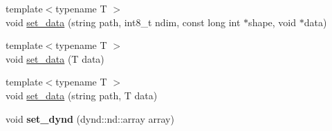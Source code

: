 \begin{DoxyCompactItemize}
\item 
{\footnotesize template$<$typename T $>$ }\\void \hyperlink{classhdc_a009b92dac161a40dc8e17231a4575c1a}{set\+\_\+data} (string path, int8\+\_\+t ndim, const long int $\ast$shape, void $\ast$data)
\item 
{\footnotesize template$<$typename T $>$ }\\void \hyperlink{classhdc_a4465da11f7821ef4d405cd8805d77459}{set\+\_\+data} (T data)
\item 
{\footnotesize template$<$typename T $>$ }\\void \hyperlink{classhdc_a5a15d6128e566f802263c3fbf69a1d49}{set\+\_\+data} (string path, T data)
\item 
void {\bfseries set\+\_\+dynd} (dynd\+::nd\+::array array)\hypertarget{classhdc_a4fae038574f9adbc8b6dbb8524677097}{}\label{classhdc_a4fae038574f9adbc8b6dbb8524677097}


\end{DoxyCompactItemize}
